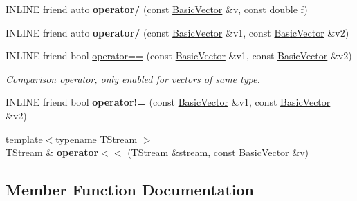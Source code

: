 \begin{DoxyCompactItemize}
\item 
\hypertarget{classBasicVector_3_01double_01_4_a5ff45fbca5ed9c7be4275e85d148881e}{}\label{classBasicVector_3_01double_01_4_a5ff45fbca5ed9c7be4275e85d148881e} 
I\+N\+L\+I\+NE friend auto {\bfseries operator/} (const \hyperlink{classBasicVector}{Basic\+Vector} \&v, const double f)
\item 
\hypertarget{classBasicVector_3_01double_01_4_aa1877a346e7aa1ea57737628a58589e7}{}\label{classBasicVector_3_01double_01_4_aa1877a346e7aa1ea57737628a58589e7} 
I\+N\+L\+I\+NE friend auto {\bfseries operator/} (const \hyperlink{classBasicVector}{Basic\+Vector} \&v1, const \hyperlink{classBasicVector}{Basic\+Vector} \&v2)
\item 
I\+N\+L\+I\+NE friend bool \hyperlink{classBasicVector_3_01double_01_4_a89893ab07524d683177877fc3f1a34d6}{operator==} (const \hyperlink{classBasicVector}{Basic\+Vector} \&v1, const \hyperlink{classBasicVector}{Basic\+Vector} \&v2)
\begin{DoxyCompactList}\small\item\em Comparison operator, only enabled for vectors of same type. \end{DoxyCompactList}\item 
\hypertarget{classBasicVector_3_01double_01_4_a214517caa81358c78e46ffea40acab05}{}\label{classBasicVector_3_01double_01_4_a214517caa81358c78e46ffea40acab05} 
I\+N\+L\+I\+NE friend bool {\bfseries operator!=} (const \hyperlink{classBasicVector}{Basic\+Vector} \&v1, const \hyperlink{classBasicVector}{Basic\+Vector} \&v2)
\item 
\hypertarget{classBasicVector_3_01double_01_4_a326bb814a09dab7d58edd595b3db3813}{}\label{classBasicVector_3_01double_01_4_a326bb814a09dab7d58edd595b3db3813} 
{\footnotesize template$<$typename T\+Stream $>$ }\\T\+Stream \& {\bfseries operator$<$$<$} (T\+Stream \&stream, const \hyperlink{classBasicVector}{Basic\+Vector} \&v)
\end{DoxyCompactItemize}


\subsection{Member Function Documentation}
\hypertarget{classBasicVector_3_01double_01_4_a9ef4881becf50b273cfae52c89fcd5fc}{}\label{classBasicVector_3_01double_01_4_a9ef4881becf50b273cfae52c89fcd5fc} 
